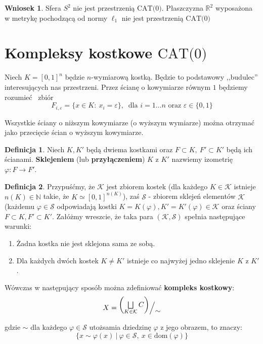 \documentclass[licencjacka]{pracamgr}
\theoremstyle{definition}
\newtheorem{definition}{Definicja}[section]
\theoremstyle{definition}
\theoremstyle{definition}
\theoremstyle{definition}
\newtheorem{corollary}{Wniosek}[section]
\theoremstyle{plain}
\theoremstyle{plain}
\def\quotient#1#2{%
    \raise1ex\hbox{$#1$}\Big/\lower1ex\hbox{$#2$}%
}
\begin{document}
\begin{corollary}
	Sfera $ S^2 $ nie jest przestrzenią $ \text{CAT(0)} $. Płaszczyzna $ \mathbb{R}^2 $ 
	wyposażona w metrykę pochodzącą od normy $ \ell_1 $ nie jest przestrzenią $ \text{CAT(0)} $
\end{corollary}

\section{Kompleksy kostkowe $ \text{CAT(0)} $}
Niech $ K = [0,1]^n $ będzie $ n $-wymiarową kostką. Będzie to podstawowy ,,budulec'' 
interesujących nas przestrzeni. Przez ścianę o kowymiarze równym $ 1 $ będziemy rozumieć 
zbiór $$ F_{i,\varepsilon}  = \{x \in K : ~ x_i = \varepsilon\}, ~ \text{ dla } i = 1 
\dots n \text{ oraz }\varepsilon \in \{0,1\}$$

Wszystkie ściany o niższym kowymiarze (o wyższym wymiarze) można otrzymać jako 
przecięcie ścian o wyższym kowymiarze.

\begin{definition}
	Niech $ K,K' $ będą dwiema kostkami oraz $ F \subset K, ~ F' \subset K' $ będą 
	ich ścianami. \textbf{Sklejeniem} (lub \textbf{przyłączeniem}) $ K $ z $ K' $ nazwiemy 
	izometrię $ \varphi: F \rightarrow F' $.
\end{definition}

\begin{definition}
	Przypuśćmy, że $ \mathcal{K} $ jest zbiorem kostek (dla każdego $ K \in 
	\mathcal{K} $ istnieje $ n(K) \in \mathbb{N} $ takie, że $ K \simeq [0,1]^{n(K)} $), 
	zaś $ \mathcal{S} $ - zbiorem sklejeń elementów $ \mathcal{K} $ (każdemu 
	$ \varphi \in \mathcal{S} $ odpowiadają kostki $ K = K(\varphi), K' = 
	K'(\varphi) \in \mathcal{K} $ oraz ściany $ F \subset K, F' \subset K' $. Załóżmy 
	wreszcie, że taka para 	$ (\mathcal{K}, \mathcal{S})  $ spełnia następujące warunki:

	\begin{enumerate}
		\item Żadna kostka nie jest sklejona sama ze sobą.
		\item Dla każdych dwóch kostek $ K \neq K' $ istnieje co najwyżej jedno
		sklejenie $ K $ z $ K'$.
	\end{enumerate}

	Wówczas w następujący sposób można zdefiniować \textbf{kompleks kostkowy}:
	$$ X =  \quotient{\left( \bigsqcup\limits_{K \in \mathcal{K}} C \right)}{\sim} $$

	gdzie $ \sim $ dla każdego $ \varphi \in \mathcal{S} $ utożsamia dziedzinę $ \varphi $ 
	z jego obrazem, to znaczy: $$ \{ x \sim \varphi(x) ~ | ~ \varphi \in \mathcal{S}, ~ 
	x \in \text{dom}(\varphi) \} $$
\end{definition}
\end{document}
